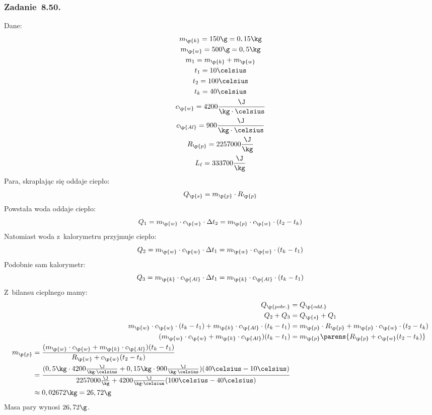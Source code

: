 \subsubsection*{Zadanie~8.50.}
Dane:
\begin{gather*}
    m_\p{k} = 150\g = 0,15\kg\\
    m_\p{w} = 500\g = 0,5\kg\\
    m_1 = m_\p{k} + m_\p{w}\\
    t_1 = 10\celsius\\
    t_2 = 100\celsius\\
    t_k = 40\celsius\\
    c_\p{w} = 4200\frac{\J}{\kg \cdot \celsius}\\
    c_\p{Al} = 900\frac{\J}{\kg \cdot \celsius}\\
    R_\p{p} = 2257000\frac{\J}{\kg}\\
    L_\ell = 333700\frac{\J}{\kg}
\end{gather*}
Para, skraplając się oddaje ciepło:
\begin{equation*}
    Q_\p{s} = m_\p{p} \cdot R_\p{p}
\end{equation*}
Powstała woda oddaje ciepło:
\begin{equation*}
    Q_1 = m_\p{w} \cdot c_\p{w} \cdot \Delta t_2 = m_\p{p} \cdot c_\p{w} \cdot (t_2 - t_k)
\end{equation*}
Natomiast woda z~kalorymetru przyjmuje ciepło:
\begin{equation*}
    Q_2 = m_\p{w} \cdot c_\p{w} \cdot \Delta t_1 = m_\p{w} \cdot c_\p{w} \cdot (t_k - t_1)
\end{equation*}
Podobnie sam kalorymetr:
\begin{equation*}
    Q_3 = m_\p{k} \cdot c_\p{Al} \cdot \Delta t_1 = m_\p{k} \cdot c_\p{Al} \cdot (t_k - t_1)
\end{equation*}
Z~bilansu cieplnego mamy:
\begin{align*}
    Q_\p{pobr.} &= Q_\p{odd.}\\
    Q_2 + Q_3 &= Q_\p{s} + Q_1\\
    m_\p{w} \cdot c_\p{w} \cdot (t_k - t_1) + m_\p{k} \cdot c_\p{Al} \cdot (t_k - t_1) &= m_\p{p} \cdot R_\p{p} + m_\p{p} \cdot c_\p{w} \cdot (t_2 - t_k)\\
    (m_\p{w} \cdot c_\p{w} + m_\p{k} \cdot c_\p{Al}) (t_k - t_1) &= m_\p{p} \parens{R_\p{p} + c_\p{w} (t_2 - t_k)}\\
    \begin{split}
        m_\p{p} &= \frac{(m_\p{w} \cdot c_\p{w} + m_\p{k} \cdot c_\p{Al}) (t_k - t_1)}{R_\p{w} + c_\p{w} (t_2 - t_k)}\\
            &= \frac{(0,5\kg \cdot 4200\frac{\J}{\kg \cdot \celsius} + 0,15\kg \cdot 900\frac{\J}{\kg \cdot \celsius}) (40\celsius - 10\celsius)}{2257000\frac{\J}{\kg} + 4200\frac{\J}{\kg \cdot \celsius} (100\celsius - 40\celsius)}\\
            &\approx 0,02672\kg
            = 26,72\g
    \end{split}
\end{align*}
\answer{} Masa pary wynosi \(26,72\g\).
